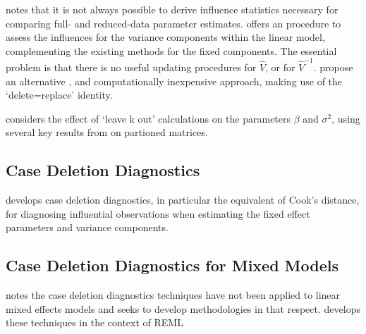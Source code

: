 \documentclass[12pt, a4paper]{report}
\theoremstyle{plain}
\theoremstyle{definition}
\theoremstyle{remark}
\begin{document}
% 
\citet{schabenberger} notes that it is not always possible to
derive influence statistics necessary for comparing full- and
reduced-data parameter estimates. \citet{HaslettDillane} offers an
procedure to assess the influences for the variance components
within the linear model, complementing the existing methods for
the fixed components. The essential problem is that there is no
useful updating procedures for $\hat{V}$, or for $\hat{V}^{-1}$.
\citet{HaslettDillane} propose an alternative , and
computationally inexpensive approach, making use of the
`delete=replace' identity.

\citet{Haslett99} considers the effect of `leave k out'
calculations on the parameters $\beta$ and $\sigma^{2}$, using
several key results from \citet{HaslettHayes} on partioned
matrices.





% 
% 
% 


\subsection{Case Deletion Diagnostics} %


\citet{CPJ} develops  case deletion diagnostics, in particular the equivalent of  Cook's distance, for diagnosing influential observations when estimating the fixed effect parameters and variance components.


\subsection{Case Deletion Diagnostics for Mixed Models}

\citet{Christiansen} notes the case deletion diagnostics techniques have not been applied to linear mixed effects models and seeks to develop methodologies in that respect. \citet{Christiansen} develops these techniques in the context of REML
\end{document}
